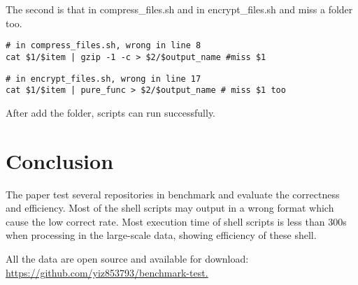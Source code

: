 \documentclass[sigplan, screen, 10pt]{acmart}
\begin{document}
The second is that in compress\_files.sh and in encrypt\_files.sh and miss a folder too.
\begin{verbatim}
# in compress_files.sh, wrong in line 8
cat $1/$item | gzip -1 -c > $2/$output_name #miss $1
\end{verbatim}

\begin{verbatim}
# in encrypt_files.sh, wrong in line 17
cat $1/$item | pure_func > $2/$output_name # miss $1 too
\end{verbatim}
After add the folder, scripts can run successfully.

\section{Conclusion}
\label{conclusion}
The paper test several repositories in benchmark and evaluate the correctness and efficiency. Most of the shell scripts may output in a wrong format which cause the low correct rate. 
Most execution time of shell scripts is less than 300s when processing in the large-scale data, showing efficiency of these shell. \par
All the data are open source and available for download: \href{https://github.com/yiz853793/benchmark-test}{https://github.com/yiz853793/benchmark-test.}


{\small

}
\end{document}
